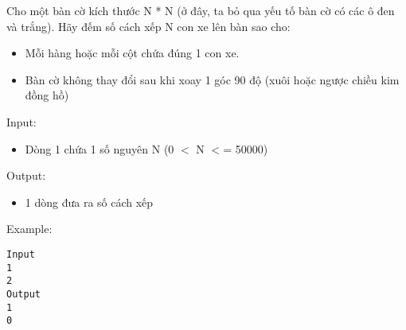 

Cho một bàn cờ kích thước N * N (ở đây, ta bỏ qua yếu tố bàn cờ có các ô đen và trắng). Hãy đếm số cách xếp N con xe lên bàn sao cho:
\begin{itemize}
	\item Mỗi hàng hoặc mỗi cột chứa đúng 1 con xe.
	\item Bàn cờ không thay đổi sau khi xoay 1 góc 90 độ (xuôi hoặc ngược chiều kim đồng hồ)
\end{itemize}

Input:
\begin{itemize}
	\item 

Dòng 1 chứa 1 số nguyên N (0 $<$ N $<$= 50000)
\end{itemize}

Output:
\begin{itemize}
	\item 

1 dòng đưa ra số cách xếp
\end{itemize}

Example:
\begin{verbatim}
Input
1
2
Output
1
0 \end{verbatim}